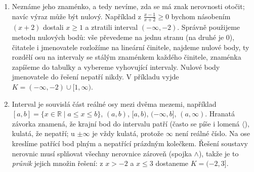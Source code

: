 \begin{enumerate}[label=\textbf{\arabic*.}, leftmargin=*, itemsep=0.8em]
  \item {}
  Neznáme jeho znaménko, a tedy nevíme, zda se má znak nerovnosti otočit; navíc výraz může být nulový. Například z $\frac{x - 1}{x + 2}\geq 0$ bychom násobením $(x + 2)$ dostali $x\geq 1$ a ztratili interval $(-\infty, -2)$. Správně použijeme metodu nulových bodů: vše převedeme na jednu stranu (na druhé je $0$), čitatele i jmenovatele rozložíme na lineární činitele, najdeme nulové body, ty rozdělí osu na intervaly se stálým znaménkem každého činitele, znaménka zapíšeme do tabulky a vybereme vyhovující intervaly. Nulové body jmenovatele do řešení nepatří nikdy. V příkladu vyjde $K = (-\infty, -2)\cup[1, \infty)$. 

  \item {}
  Interval je souvislá část reálné osy mezi dvěma mezemi, například $[a, b] = \{x\in\mathbb{R} \mid a\leq x\leq b\}$, $(a, b)$, $[a, b)$, $(-\infty, b]$, $(a, \infty)$. Hranatá závorka znamená, že krajní bod do intervalu patří (často se píše i lomená $\langle$), kulatá, že nepatří; u $\pm\infty$ je vždy kulatá, protože $\infty$ není reálné číslo. Na ose kreslíme patřící bod plným a nepatřící prázdným kolečkem. Řešení soustavy nerovnic musí splňovat všechny nerovnice zároveň (spojka $\land$), takže je to \emph{průnik} jejich množin řešení: z $x > -2$ a $x\leq 3$ dostaneme $K = (-2, 3]$. 


\end{enumerate}
